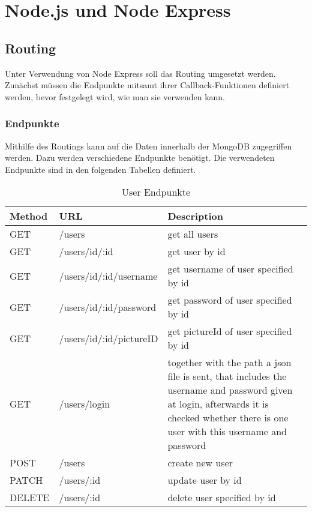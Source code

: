 \chapter{Node.js und Node Express}

\section{Routing}
Unter Verwendung von Node Express soll das Routing umgesetzt werden. Zunächst müssen die Endpunkte mitsamt ihrer Callback-Funktionen definiert werden, bevor festgelegt wird, wie man sie verwenden kann.

\subsection{Endpunkte}

Mithilfe des Routings kann auf die Daten innerhalb der MongoDB zugegriffen werden. Dazu werden verschiedene Endpunkte benötigt. Die verwendeten Endpunkte sind in den folgenden Tabellen definiert.

\begin{table}[!htb]
\begin{tabularx}{\textwidth}{|X|X|X|}
    \hline
    \textbf{Method} & \textbf{URL} & \textbf{Description} \\
    \hline
    \hline
    GET & /users & get all users\\
    \hline
    GET & /users/id/:id & get user by id\\
    \hline
    GET & /users/id/:id/username & get username of user specified by id\\
    \hline 
    GET & /users/id/:id/password & get password of user specified by id\\
    \hline
    GET & /users/id/:id/pictureID & get pictureId of user specified by id\\
    \hline
    GET & /users/login & together with the path a json file is sent, that includes the username and password given at login, afterwards it is checked whether there is one user with this username and password\\
    \hline
    POST & /users & create new user\\
    \hline
    PATCH & /users/:id & update user by id\\
    \hline
    DELETE & /users/:id & delete user specified by id\\
    \hline
\end{tabularx}
\caption{User Endpunkte}
\label{endpunkte}
\end{table}


